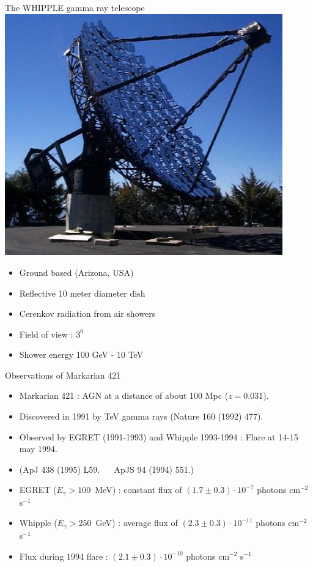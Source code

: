 \Tr
\vspace*{0.5cm}
\begin{center}
{\blue The WHIPPLE gamma ray telescope}\\[5mm]
\includegraphics[keepaspectratio,width=12cm]{whipple}
\end{center}

\newpage
\vspace*{3cm}
%
\begin{itemize}
\item Ground based (Arizona, USA)
\item[] Reflective 10 meter diameter dish
\item Cerenkov radiation from air showers
\item[] Field of view : $3^{0}$
\item[] Shower energy 100 GeV - 10 TeV
\end{itemize}

\Tr
\onecolumn
\begin{center}
{\blue Observations of Markarian 421}
\end{center}
%
\begin{itemize}
\item Markarian 421 : AGN at a distance of about 100 Mpc ($z=0.031$).
\item Discovered in 1991 by TeV gamma rays (Nature 160 (1992) 477).
\item Observed by EGRET (1991-1993) and Whipple 1993-1994 : Flare at 14-15 may 1994.
\item[] (ApJ 438 (1995) L59. $\quad$  ApJS 94 (1994) 551.)
\item EGRET ($E_{\gamma}>100$~MeV) : constant flux of $(1.7 \pm 0.3) \cdot 10^{-7}$ photons cm$^{-2}$ s$^{-1}$ 
\item Whipple ($E_{\gamma}>250$~GeV) : average flux of $(2.3 \pm 0.3) \cdot 10^{-11}$ photons cm$^{-2}$ s$^{-1}$ 
\item[] Flux during 1994 flare : $(2.1 \pm 0.3) \cdot 10^{-10}$ photons cm$^{-2}$ s$^{-1}$ 
\end{itemize}

